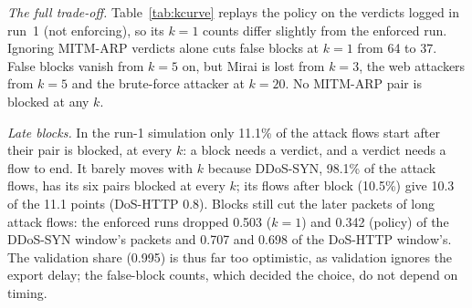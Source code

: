 \emph{The full trade-off.} Table~\ref{tab:kcurve} replays the policy on the verdicts logged in run~1 (not enforcing), so its $k=1$ counts differ slightly from the enforced run. Ignoring MITM-ARP verdicts alone cuts false blocks at $k=1$ from 64 to 37. False blocks vanish from $k=5$ on, but Mirai is lost from $k=3$, the web attackers from $k=5$ and the brute-force attacker at $k=20$. No MITM-ARP pair is blocked at any $k$.

\emph{Late blocks.} In the run-1 simulation only 11.1\% of the attack flows start after their pair is blocked, at every $k$: a block needs a verdict, and a verdict needs a flow to end. It barely moves with $k$ because DDoS-SYN, 98.1\% of the attack flows, has its six pairs blocked at every $k$; its flows after block (10.5\%) give 10.3 of the 11.1 points (DoS-HTTP 0.8). Blocks still cut the later packets of long attack flows: the enforced runs dropped 0.503 ($k=1$) and 0.342 (policy) of the DDoS-SYN window's packets and 0.707 and 0.698 of the DoS-HTTP window's. The validation share (0.995) is thus far too optimistic, as validation ignores the export delay; the false-block counts, which decided the choice, do not depend on timing.
